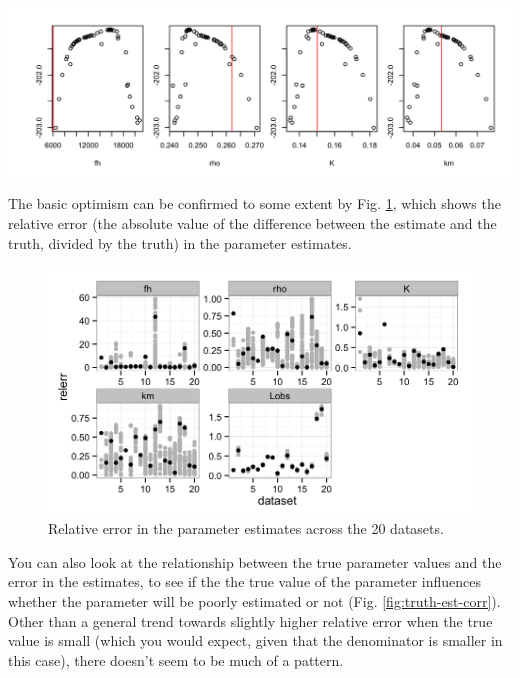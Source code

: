 \documentclass[12pt,reqno,final,pdftex]{amsart}\usepackage[]{graphicx}\usepackage[]{color}
\newenvironment{knitrout}{}{} %
\theoremstyle{plain}
\numberwithin{equation}{part}
\begin{document}
\begin{knitrout}
\includegraphics[width=\linewidth]{figure/unnamed-chunk-4-20} \hfill{}



\end{knitrout}

\clearpage

The basic optimism can be confirmed to some extent by Fig. \ref{fig:mult-datasets-relerr}, which shows the relative error (the absolute value of the difference between the estimate and the truth, divided by the truth) in the parameter estimates.

\begin{knitrout}\scriptsize
{}\color{fgcolor}\begin{figure}

\includegraphics[width=\linewidth]{figure/mult-datasets-relerr-1} \hfill{}

\caption[Relative error in the parameter estimates across the 20 datasets]{Relative error in the parameter estimates across the 20 datasets.}\label{fig:mult-datasets-relerr}
\end{figure}


\end{knitrout}

You can also look at the relationship between the true parameter values and the error in the estimates, to see if the the true value of the parameter influences whether the parameter will be poorly estimated or not (Fig. \ref{fig:truth-est-corr}).
Other than a general trend towards slightly higher relative error when the true value is small (which you would expect, given that the denominator is smaller in this case), there doesn't seem to be much of a pattern.
\end{document}

